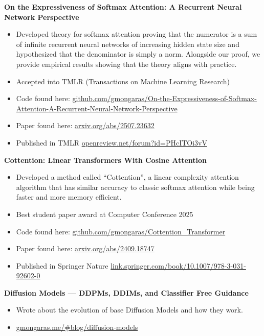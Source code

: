 \documentclass[a4paper,10pt]{article}
\begin{document}
\noindent\textbf{On the Expressiveness of Softmax Attention: A Recurrent Neural Network Perspective}
\begin{itemize}[noitemsep,topsep=0pt]
  \item Developed theory for softmax attention proving that the numerator is a sum of infinite recurrent neural networks of increasing hidden state size and hypothesized that the denominator is simply a norm. Alongside our proof, we provide empirical results showing that the theory aligns with practice.
  \item Accepted into TMLR (Transactions on Machine Learning Research)
  \item Code found here: \href{https://github.com/gmongaras/On-the-Expressiveness-of-Softmax-Attention-A-Recurrent-Neural-Network-Perspective}{github.com/gmongaras/On-the-Expressiveness-of-Softmax-Attention-A-Recurrent-Neural-Network-Perspective}
  \item Paper found here: \href{https://arxiv.org/abs/2507.23632}{arxiv.org/abs/2507.23632}
  \item Published in TMLR \href{https://openreview.net/forum?id=PHcITOi3vV}{openreview.net/forum?id=PHcITOi3vV}
\end{itemize}

\noindent\textbf{Cottention: Linear Transformers With Cosine Attention}
\begin{itemize}[noitemsep,topsep=0pt]
  \item Developed a method called “Cottention”, a linear complexity attention algorithm that has similar accuracy to classic softmax attention while being faster and more memory efficient.
  \item Best student paper award at Computer Conference 2025
  \item Code found here: \href{https://github.com/gmongaras/Cottention_Transformer}{github.com/gmongaras/Cottention\_Transformer}
  \item Paper found here: \href{https://arxiv.org/abs/2409.18747}{arxiv.org/abs/2409.18747}
  \item Published in Springer Nature \href{https://link.springer.com/chapter/10.1007/978-3-031-92602-0_32}{link.springer.com/book/10.1007/978-3-031-92602-0}
\end{itemize}

\noindent\textbf{Diffusion Models — DDPMs, DDIMs, and Classifier Free Guidance}
\begin{itemize}[noitemsep,topsep=0pt]
  \item Wrote about the evolution of base Diffusion Models and how they work.
  \item \href{https://gmongaras.me/#blog/diffusion-models}{gmongaras.me/\#blog/diffusion-models}
\end{itemize}
\end{document}
